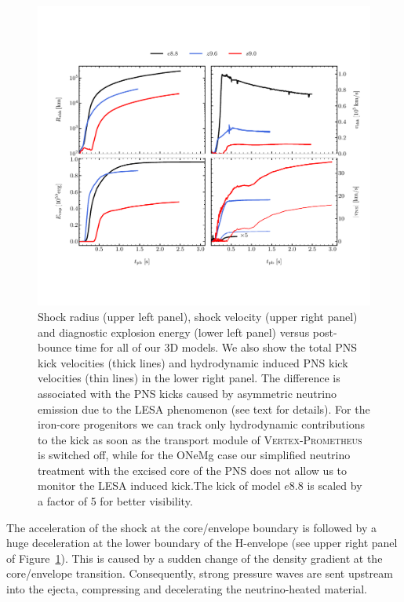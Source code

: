 \documentclass[fleqn,usenatbib]{mnras}
\newcommand{\vertexprom}{\textsc{Vertex-Prometheus}\xspace}
\newcommand{\GEO}[1]{{\color{red}#1}}
\begin{document}
\begin{figure}
 \centering
 \includegraphics[width=\textwidth,trim=0.1cm 2.1cm 0cm 2.3cm,clip]{./pic/eexp_shk_kick_all_paper.pdf}
 \caption{Shock radius (upper left panel), shock velocity (upper right panel) and diagnostic explosion energy (lower left panel) versus post-bounce time for all of our 3D models. We also show the total PNS kick velocities (thick lines) and hydrodynamic induced PNS kick velocities (thin lines) in the lower right panel. \GEO{The difference is associated with the PNS kicks caused by asymmetric neutrino emission due to the LESA phenomenon (see text for details). For the iron-core progenitors we can track only hydrodynamic contributions to the kick as soon as the transport module of \vertexprom is switched off, while for the ONeMg case our simplified neutrino treatment with the excised core of the PNS does not allow us to monitor the LESA induced kick.}The kick of model $e8.8$ is scaled by a factor of 5 for better visibility. }
\label{fig:eexp all}
\end{figure}

The acceleration of the shock at the core/envelope boundary is followed by a huge deceleration at the lower boundary of the H-envelope (see upper right panel of Figure~\ref{fig:eexp all}). This is caused by a sudden change of the density gradient at the core/envelope transition.  
Consequently, strong pressure waves are sent upstream into the ejecta, compressing and decelerating the neutrino-heated material.
\end{document}
